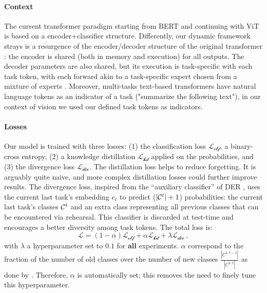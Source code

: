 \paragraph{Context} The current transformer paradigm starting from BERT \citep{devlin2018bert} and
continuing with ViT \citep{dosovitskiy2020vit} is based on a encoder+classifier structure.
Differently, our dynamic framework strays is a resurgence of the encoder/decoder structure of the
original transformer \citep{vaswani2017transformer}: the encoder is shared (both in memory and
execution) for all outputs. The decoder parameters are also shared, but its execution is
task-specific with each task token, with each forward akin to a task-specific expert chosen from a
mixture of experts \citep{masoudnia2014mixture}. Moreover, multi-tasks text-based transformers have
natural language tokens as an indicator of a task \citep{raffel2019t5} (\eg "summarize the
following text"), in our context of vision we used our defined task tokens as indicators.

\label{sec:dytox_training}

\paragraph{Losses} Our model is trained with three losses: (1) the classification loss
$\mathcal{L_\text{clf}}$, a binary-cross entropy, (2) a knowledge distillation
\citep{hinton2015knowledge_distillation} $\mathcal{L_\text{kd}}$ applied on the probabilities, and
(3) the divergence loss $\mathcal{L_\text{div}}$. The distillation loss helps to reduce forgetting.
It is arguably quite naive, and more complex distillation losses
\citep{selvaraju2017gradcam,hou2019ucir,douillard2020podnet} could further improve results. The
divergence loss, inspired from the ``auxiliary classifier'' of DER \citep{yan2021der}, uses the
current last task's embedding $e_t$ to predict ($|\mathcal{C}^t| + 1$) probabilities: the current last
task's classes $\mathcal{C}^t$ and an extra class representing all previous classes that can be encountered
via rehearsal. This classifier is discarded at test-time and encourages a better diversity among
task tokens. The total loss is:
%
\begin{equation}
    \mathcal{L} = (1 - \alpha) \mathcal{L_\text{clf}} + \alpha \mathcal{L_\text{kd}} + \lambda \mathcal{L_\text{div}}\,,
    \label{eq:dytox_final_loss}
\end{equation}
%
with $\lambda$ a hyperparameter set to $0.1$ for \textbf{all} experiments. $\alpha$ correspond to
the fraction of the number of old classes over the number of new classes
$\frac{|C^{1:t-1}|}{|C^{1:t}|}$ as done by \citet{zhao2020weightalignement}. Therefore, $\alpha$ is
automatically set; this removes the need to finely tune this hyperparameter.

